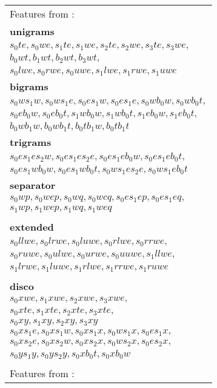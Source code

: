 \documentclass[11pt]{article}
\begin{document}
\begin{figure}
  \begin{adjustbox}{margin=3pt,frame}

\begin{tabular}{>{\small}l}
{Features from \cite{zhang2009transition}:} \\
\textbf{unigrams} \\
$s_0te, s_0we, s_1te, s_1we, s_2te, s_2we, s_3te, s_3we,$ \\
$b_0wt, b_1wt, b_2wt, b_3wt,$ \\
$s_0lwe, s_0rwe, s_0uwe, s_1lwe, s_1rwe, s_1uwe$ \\
\textbf{bigrams} \\
$s_0ws_1w, s_0ws_1e, s_0es_1w, s_0es_1e, s_0wb_0w, s_0wb_0t,$ \\
$s_0eb_0w, s_0eb_0t, s_1wb_0w, s_1wb_0t, s_1eb_0w, s_1eb_0t,$ \\
$b_0wb_1w, b_0wb_1t, b_0tb_1w, b_0tb_1t$ \\
\textbf{trigrams} \\
$s_0es_1es_2w, s_0es_1es_2e, s_0es_1eb_0w, s_0es_1eb_0t,$ \\
$s_0es_1wb_0w, s_0es_1wb_0t, s_0ws_1es_2e, s_0ws_1eb_0t$ \\
\textbf{separator} \\
$s_0wp, s_0wep, s_0wq, s_0wcq, s_0es_1ep, s_0es_1eq,$ \\
$s_1wp, s_1wep, s_1wq, s_1weq$ \\
\\
\textbf{extended} \cite{zhu2013fast} \\
$s_0llwe, s_0lrwe, s_0luwe, s_0rlwe, s_0rrwe,$ \\
$s_0ruwe, s_0ulwe, s_0urwe, s_0uuwe, s_1llwe,$ \\
$s_1lrwe, s_1luwe, s_1rlwe, s_1rrwe, s_1ruwe$ \\
\\
\textbf{disco} \cite{maier2015discontinuous} \\
$s_0xwe, s_1xwe, s_2xwe, s_3xwe,$ \\
$s_0xte, s_1xte, s_2xte, s_3xte,$ \\
$s_0xy, s_1xy, s_2xy, s_3xy$ \\
$s_0xs_1e, s_0xs_1w, s_0xs_1x, s_0ws_1x, s_0es_1x,$ \\
$s_0xs_2e, s_0xs_2w, s_0xs_2x, s_0ws_2x, s_0es_2x,$ \\
$s_0ys_1y, s_0ys_2y, s_0xb_0t, s_0xb_0w$ \\
\\
{\footnotesize Features from \cite{tokgoz2015transition}:} \\

\end{tabular}
\end{adjustbox}
\end{figure}
\end{document}

